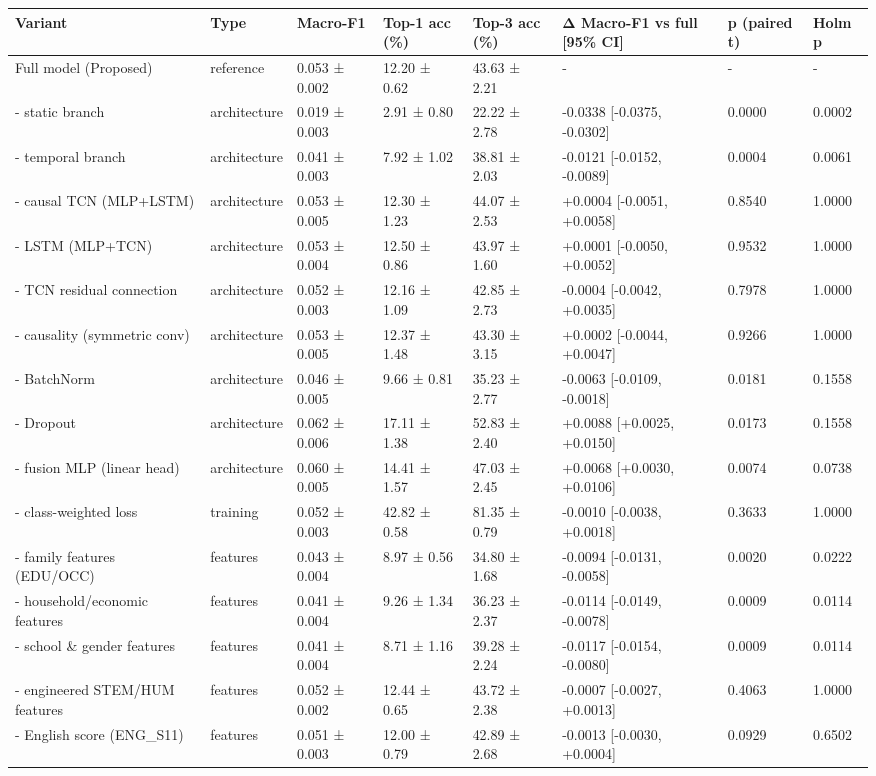 \begin{tabular}{llllllll}
\toprule
Variant & Type & Macro-F1 & Top-1 acc (\%) & Top-3 acc (\%) & Δ Macro-F1 vs full [95\% CI] & p (paired t) & Holm p \\
\midrule
Full model (Proposed) & reference & 0.053 ± 0.002 & 12.20 ± 0.62 & 43.63 ± 2.21 & - & - & - \\
- static branch & architecture & 0.019 ± 0.003 & 2.91 ± 0.80 & 22.22 ± 2.78 & -0.0338 [-0.0375, -0.0302] & 0.0000 & 0.0002 \\
- temporal branch & architecture & 0.041 ± 0.003 & 7.92 ± 1.02 & 38.81 ± 2.03 & -0.0121 [-0.0152, -0.0089] & 0.0004 & 0.0061 \\
- causal TCN (MLP+LSTM) & architecture & 0.053 ± 0.005 & 12.30 ± 1.23 & 44.07 ± 2.53 & +0.0004 [-0.0051, +0.0058] & 0.8540 & 1.0000 \\
- LSTM (MLP+TCN) & architecture & 0.053 ± 0.004 & 12.50 ± 0.86 & 43.97 ± 1.60 & +0.0001 [-0.0050, +0.0052] & 0.9532 & 1.0000 \\
- TCN residual connection & architecture & 0.052 ± 0.003 & 12.16 ± 1.09 & 42.85 ± 2.73 & -0.0004 [-0.0042, +0.0035] & 0.7978 & 1.0000 \\
- causality (symmetric conv) & architecture & 0.053 ± 0.005 & 12.37 ± 1.48 & 43.30 ± 3.15 & +0.0002 [-0.0044, +0.0047] & 0.9266 & 1.0000 \\
- BatchNorm & architecture & 0.046 ± 0.005 & 9.66 ± 0.81 & 35.23 ± 2.77 & -0.0063 [-0.0109, -0.0018] & 0.0181 & 0.1558 \\
- Dropout & architecture & 0.062 ± 0.006 & 17.11 ± 1.38 & 52.83 ± 2.40 & +0.0088 [+0.0025, +0.0150] & 0.0173 & 0.1558 \\
- fusion MLP (linear head) & architecture & 0.060 ± 0.005 & 14.41 ± 1.57 & 47.03 ± 2.45 & +0.0068 [+0.0030, +0.0106] & 0.0074 & 0.0738 \\
- class-weighted loss & training & 0.052 ± 0.003 & 42.82 ± 0.58 & 81.35 ± 0.79 & -0.0010 [-0.0038, +0.0018] & 0.3633 & 1.0000 \\
- family features (EDU/OCC) & features & 0.043 ± 0.004 & 8.97 ± 0.56 & 34.80 ± 1.68 & -0.0094 [-0.0131, -0.0058] & 0.0020 & 0.0222 \\
- household/economic features & features & 0.041 ± 0.004 & 9.26 ± 1.34 & 36.23 ± 2.37 & -0.0114 [-0.0149, -0.0078] & 0.0009 & 0.0114 \\
- school \& gender features & features & 0.041 ± 0.004 & 8.71 ± 1.16 & 39.28 ± 2.24 & -0.0117 [-0.0154, -0.0080] & 0.0009 & 0.0114 \\
- engineered STEM/HUM features & features & 0.052 ± 0.002 & 12.44 ± 0.65 & 43.72 ± 2.38 & -0.0007 [-0.0027, +0.0013] & 0.4063 & 1.0000 \\
- English score (ENG\_S11) & features & 0.051 ± 0.003 & 12.00 ± 0.79 & 42.89 ± 2.68 & -0.0013 [-0.0030, +0.0004] & 0.0929 & 0.6502 \\
\bottomrule
\end{tabular}
